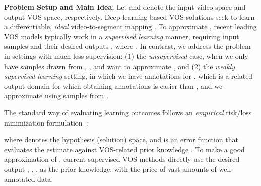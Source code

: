 \documentclass[10pt,twocolumn,letterpaper]{article}
\begin{document}
\noindent\textbf{Problem Setup and Main Idea.}
Let \bm{} and \bm{} denote the input video space and output VOS space, respectively. Deep learning based VOS solutions seek to learn a differentiable, \textit{ideal} video-to-segment mapping  \bm{}\bm{}. To approximate , recent leading VOS models typically work in a \textit{supervised learning} manner, requiring  input
samples and their desired outputs , where
\bm{}\bm{}. In contrast, we address the problem in settings with much less supervision: (1) the \textit{unsupervised} case, when we only have samples drawn from  \bm{}, \bm{}, and want to approximate , and (2) the
\textit{weakly supervised learning} setting, in which  we have annotations for
\bm{}, which  is a related output domain for which obtaining
annotations is easier than \bm{}, and we approximate  using samples from
\bm{}\bm{}. 

The standard way of evaluating learning outcomes follows an \textit{empirical} risk/loss minimization formulation~\!\cite{Shen_2018_CVPR}:
\vspace{-5pt}

where \bm{} denotes the hypothesis (solution) space, and \bm{}\bm{} is an error function that evaluates the estimate  against VOS-related prior knowledge \bm{}. To make   a good approximation of , current supervised VOS methods directly use the desired output , \ie, , as the prior knowledge, with the price of vast amounts of well-annotated data.
\end{document}
